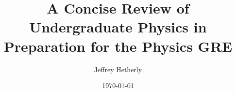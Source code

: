 \documentclass[twoside]{article}
\begin{document}
\title{A Concise Review of Undergraduate Physics in Preparation for the Physics GRE}
\author{Jeffrey Hetherly}
\date{\today}
\maketitle
\thispagestyle{empty}

\newpage
\fancyhf{}
\setlength{\headheight}{15pt}
\pagestyle{fancyplain}
\renewcommand{\headrulewidth}{0.1pt}
\renewcommand{\footrulewidth}{0.1pt}

\fancyhead[CE]{\leftmark}
\fancyfoot[LO, RE]{\thepage}

\setcounter{page}{1}
\setcounter{tocdepth}{3}
\tableofcontents

\newpage
\fancyhf{}
\setlength{\headheight}{15pt}
\pagestyle{fancyplain}
\renewcommand{\headrulewidth}{0.1pt}
\renewcommand{\footrulewidth}{0.1pt}

\fancyhead[CO]{\leftmark}
\fancyfoot[LE, RO]{\thepage}

\setcounter{page}{1}


\newpage


\newpage


\newpage


\newpage


\newpage


\newpage


\newpage


\newpage

\end{document}
